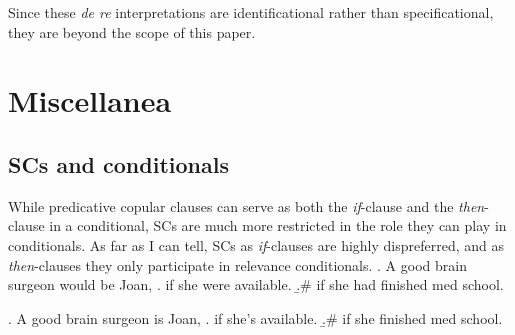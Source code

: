 \documentclass[letterpaper]{article}
\begin{document}
Since these \textit{de re} interpretations are identificational rather than specificational, they are beyond the scope of this paper.

\section{Miscellanea}
\subsection{SCs and conditionals}
While predicative copular clauses can serve as both the \textit{if}-clause and the \textit{then}-clause in a conditional, SCs are much more restricted in the role they can play in conditionals.
As far as I can tell, SCs as \textit{if}-clauses are highly dispreferred, and as \textit{then}-clauses they only participate in relevance conditionals.
\ex. A good brain surgeon would be Joan,
\a. if she were available.
\b.\# if she had finished med school.

\ex. A good brain surgeon is Joan,
\a. if she's available.
\b.\# if she finished med school.

\printbibliography
\end{document}

